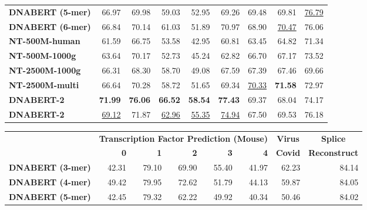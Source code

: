 \documentclass{article}
\begin{document}
\begin{table}[H]
\begin{tabular}{lrrrrrrrr}
            {\textbf{DNABERT (5-mer)} } & 66.97 & 69.98 & 59.03 & 52.95 & 69.26  &69.48 & 69.81 & \underline{76.79} \\

            {\textbf{DNABERT (6-mer) } } &  66.84 & 70.14 & 61.03 & 51.89 & 70.97 &  68.90 & \underline{70.47} & 76.06\\

            {\textbf{NT-500M-human} } & 61.59 & 66.75 & 53.58 & 42.95 & 60.81 & 63.45 & 64.82 & 71.34  \\

            {\textbf{NT-500M-1000g} } &63.64 & 70.17 & 52.73 & 45.24 & 62.82 & 66.70 & 67.17 & 73.52 \\

            {\textbf{NT-2500M-1000g} }  & 66.31 & 68.30 & 58.70 & 49.08 & 67.59 & 67.39 & 67.46 & 69.66  \\

            {\textbf{NT-2500M-multi} }  &  66.64 & 70.28 & 58.72 & 51.65 & 69.34 & \underline{70.33} & \textbf{71.58} & 72.97\\

		
		\midrule

            {\textbf{DNABERT-2} } & \textbf{71.99} & \textbf{76.06} & \textbf{66.52} & \textbf{58.54} & \textbf{77.43} & 69.37 & 68.04 & 74.17 \\

            {\textbf{DNABERT-2} } &  \underline{69.12} & 71.87 & \underline{62.96} & \underline{55.35} & \underline{74.94} & 67.50 & 69.53 & 76.18\\
		\bottomrule
	\end{tabular}

 \begin{tabular}{lrrrrrrr}
		\toprule
  & \multicolumn{5}{c}{\textbf{Transcription Factor Prediction (Mouse)}} & \multicolumn{1}{c}{\textbf{Virus}}  & \multicolumn{1}{c}{\textbf{Splice}} \\
		\cmidrule(lr){2-6}  \cmidrule(lr){7-7}  \cmidrule(lr){8-8}
		& \textbf{ 0 } & \textbf{ 1 } & \textbf{ 2 } & \textbf{ 3 } & \textbf{4} & \textbf{Covid} & \textbf{Reconstruct} \\
		\midrule
		{\textbf{DNABERT (3-mer)} } & 42.31 & 79.10 & 69.90 & 55.40 & 41.97 & 62.23 & 84.14 \\
		
		{\textbf{DNABERT (4-mer)} } & 49.42 & 79.95 & 72.62 & 51.79 & 44.13& 59.87 & 84.05\\

            {\textbf{DNABERT (5-mer)} } & 42.45 & 79.32 & 62.22 & 49.92 & 40.34&  50.46 & 84.02\\


\end{tabular}
\end{table}
\end{document}
